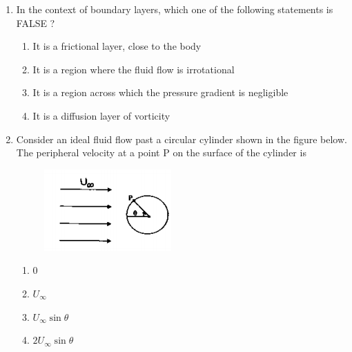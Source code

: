 \documentclass[a4paper,10pt]{article}
\begin{document}
\begin{enumerate}
\begin{multicols}{2}
\begin{enumerate}
\item P-1; R-2; Q-3; S-4
\item P-1; Q-2; R-3; S-4
\item P-1; R-2; S-3; Q-4
\item P-1; S-2; Q-3; R-4
\end{enumerate}
\end{multicols}

\item In the context of boundary layers, which one of the following statements is FALSE ?
\hfill{}

\begin{enumerate}
\item It is a frictional layer, close to the body
\item It is a region where the fluid flow is irrotational
\item It is a region across which the pressure gradient is negligible
\item It is a diffusion layer of vorticity
\end{enumerate}

\item Consider an ideal fluid flow past a circular cylinder shown in the figure below. The peripheral velocity at a point P on the surface of the cylinder is
\begin{figure}[H]
    \centering
    \includegraphics[width=0.4\columnwidth]{Bq4.png}
    \caption*{}
    \label{fig:q4}
\end{figure}
\hfill{}

\begin{multicols}{4}
\begin{enumerate}
\item 0
\item $U_\infty$
\item $U_\infty \sin \theta$
\item $2 U_\infty \sin \theta$
\end{enumerate}
\end{multicols}


\end{enumerate}
\end{document}
